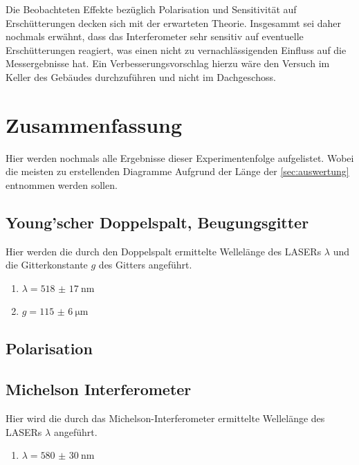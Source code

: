 \documentclass[12pt,english,ngerman]{scrartcl}
\begin{document}
Die Beobachteten Effekte bezüglich Polarisation und Sensitivität auf
Erschütterungen decken sich mit der erwarteten Theorie. Insgesammt sei daher
nochmals erwähnt, dass das Interferometer sehr sensitiv auf eventuelle
Erschütterungen reagiert, was einen nicht zu vernachlässigenden Einfluss auf
die Messergebnisse hat. Ein Verbesserungsvorschlag hierzu wäre den Versuch im
Keller des Gebäudes durchzuführen und nicht im Dachgeschoss.

\section{Zusammenfassung}\label{sec:zusammenfassung}

Hier werden nochmals alle Ergebnisse dieser Experimentenfolge aufgelistet.
Wobei die meisten zu erstellenden Diagramme Aufgrund der Länge der
\autoref{sec:auswertung} entnommen werden sollen.

\subsection{Young'scher Doppelspalt, Beugungsgitter}

Hier werden die durch den Doppelspalt ermittelte Wellelänge des LASERs
$\lambda$ und die Gitterkonstante $g$ des Gitters angeführt.

\begin{enumerate}
	\item $\lambda = \SI{518(17)}{\nm}$
	\item $g = \SI{115(6)}{\um}$
\end{enumerate}

\subsection{Polarisation}

\subsection{Michelson Interferometer}
Hier wird die durch das Michelson-Interferometer ermittelte Wellelänge des LASERs
$\lambda$ angeführt.
\begin{enumerate}
	\item $\lambda = \SI{580(30)}{\nm}$
\end{enumerate}

\newpage
\printbibliography
\listoffigures
\listoftables
\end{document}
